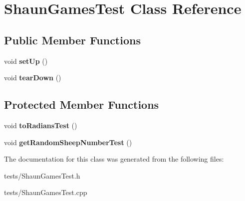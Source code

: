 \hypertarget{classShaunGamesTest}{\section{\-Shaun\-Games\-Test \-Class \-Reference}
\label{classShaunGamesTest}
}
\subsection*{\-Public \-Member \-Functions}
\begin{DoxyCompactItemize}
\item 
\hypertarget{classShaunGamesTest_ac28823579a80e51eba218cc5c14ad83a}{void {\bfseries set\-Up} ()}\label{classShaunGamesTest_ac28823579a80e51eba218cc5c14ad83a}

\item 
\hypertarget{classShaunGamesTest_a4eac20bf37edcb06406385e6d34d5a30}{void {\bfseries tear\-Down} ()}\label{classShaunGamesTest_a4eac20bf37edcb06406385e6d34d5a30}

\end{DoxyCompactItemize}
\subsection*{\-Protected \-Member \-Functions}
\begin{DoxyCompactItemize}
\item 
\hypertarget{classShaunGamesTest_a942c9a600c86425c5a366138d7055956}{void {\bfseries to\-Radians\-Test} ()}\label{classShaunGamesTest_a942c9a600c86425c5a366138d7055956}

\item 
\hypertarget{classShaunGamesTest_a48473265c196e8dc38e0d0c9c66fd3c0}{void {\bfseries get\-Random\-Sheep\-Number\-Test} ()}\label{classShaunGamesTest_a48473265c196e8dc38e0d0c9c66fd3c0}

\end{DoxyCompactItemize}


\-The documentation for this class was generated from the following files\-:\begin{DoxyCompactItemize}
\item 
tests/\-Shaun\-Games\-Test.\-h\item 
tests/\-Shaun\-Games\-Test.\-cpp\end{DoxyCompactItemize}
